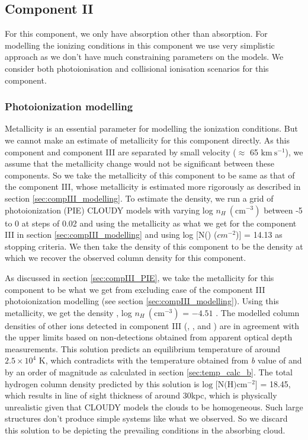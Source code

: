 \subsection{Component II} \label{sec:compII_modelling}

For this component, we only have  absorption other than  absorption. For modelling the ionizing conditions in this component we use very simplistic approach as we don't have much constraining parameters on the models. We consider both photoionisation and collisional ionisation scenarios for this component.

\subsubsection{Photoionization modelling}

Metallicity is an essential parameter for modelling the ionization conditions. But we cannot make an estimate of metallicity for this component directly. As this component and component III are separated by small velocity ($\approx$ 65 $\text{km} \ \text{s}^{-1}$), we assume that the metallicity change would not be significant between these components. So we take the metallicity of this component to be same as that of the component III, whose metallicity is estimated more rigorously as described in section \ref{sec:compIII_modelling}. To estimate the density, we run a grid of photoionization (PIE) CLOUDY models with varying log $n_H \ (\text{cm}^{-3})$ between -5 to 0 at steps of 0.02 and using the metallicity as what we get for the component III in section \ref{sec:compIII_modelling} and using log [N() (${cm}^{-2}$)] = 14.13 as stopping criteria. We then take the density of this component to be the density at which we recover the  observed column density for this component.

As discussed in section \ref{sec:compIII_PIE}, we take the metallicity for this component to be what we get from excluding  case of the component III photoionization modelling (see section \ref{sec:compIII_modelling}). Using this metallicity, we get the  density , log $n_H \ (\text{cm}^{-3})$ = $-4.51$ . The modelled column densities of other ions detected in component III (, ,  and ) are in agreement with the upper limits based on non-detections obtained from apparent optical depth measurements. This solution predicts an equilibrium temperature of around $2.5\times 10^4$ K, which contradicts with the temperature obtained from \emph{b} value of  and  by an order of magnitude as calculated in section \ref{sec:temp_calc_b}. The total hydrogen column density predicted by this solution is $\text{log [N(H)} \text{cm}^{-2}]$ = 18.45, which results in line of sight thickness of around 30kpc, which is physically unrealistic given that CLOUDY models the clouds to be homogeneous. Such large structures don't produce simple systems like what we observed. So we discard this solution to be depicting the prevailing conditions in the absorbing cloud. 

